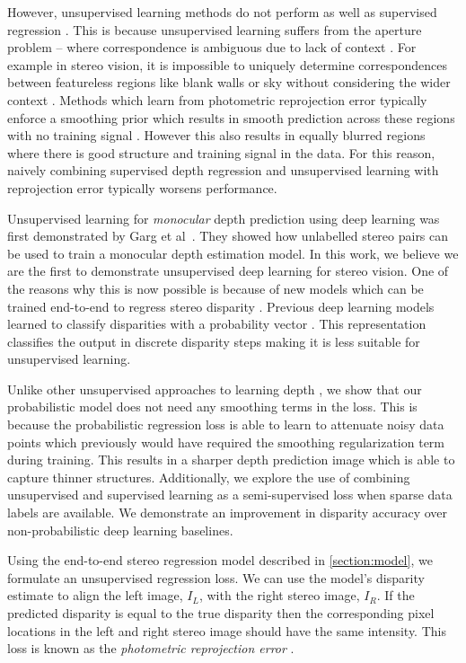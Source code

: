 However, unsupervised learning methods do not perform as well as supervised regression \citep{garg2016unsupervised,kendall2017uncertainties}.
This is because unsupervised learning suffers from the aperture problem -- where correspondence is ambiguous due to lack of context \citep{hartley2000}. For example in stereo vision, it is impossible to uniquely determine correspondences between featureless regions like blank walls or sky without considering the wider context \citep{Hirschmuller2007}. Methods which learn from photometric reprojection error typically enforce a smoothing prior which results in smooth prediction across these regions with no training signal \citep{garg2016unsupervised,monodepth17,zhou2017unsupervised}. However this also results in equally blurred regions where there is good structure and training signal in the data. For this reason, naively combining supervised depth regression and unsupervised learning with reprojection error typically worsens performance.

Unsupervised learning for \textit{monocular} depth prediction using deep learning was first demonstrated by Garg et al~\citep{garg2016unsupervised}. They showed how unlabelled stereo pairs can be used to train a monocular depth estimation model. In this work, we believe we are the first to demonstrate unsupervised deep learning for stereo vision. One of the reasons why this is now possible is because of new models which can be trained end-to-end to regress stereo disparity \citep{kendall2017end,MIFDB16}. Previous deep learning models learned to classify disparities with a probability vector \citep{zbontar2016stereo,luo2016efficient}. This representation classifies the output in discrete disparity steps making it is less suitable for unsupervised learning.

Unlike other unsupervised approaches to learning depth \citep{garg2016unsupervised}, we show that our probabilistic model does not need any smoothing terms in the loss. This is because the probabilistic regression loss is able to learn to attenuate noisy data points which previously would have required the smoothing regularization term during training. This results in a sharper depth prediction image which is able to capture thinner structures. Additionally, we explore the use of combining unsupervised and supervised learning as a semi-supervised loss when sparse data labels are available.
We demonstrate an improvement in disparity accuracy over non-probabilistic deep learning baselines. 

Using the end-to-end stereo regression model described in \cref{section:model}, we formulate an unsupervised regression loss. We can use the model's disparity estimate to align the left image, $I_L$, with the right stereo image, $I_R$. If the predicted disparity is equal to the true disparity then the corresponding pixel locations in the left and right stereo image should have the same intensity. This loss is known as the \textit{photometric reprojection error} \citep{hartley2000}.

